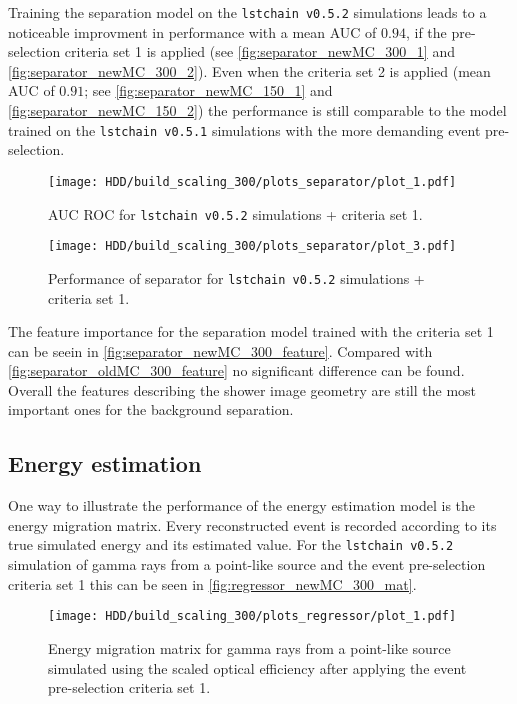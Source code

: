 Training the separation model on the \texttt{lstchain v0.5.2} simulations leads to a noticeable improvment in performance with a mean AUC of $\num{0.94}$, 
if the pre-selection criteria set 1 is applied (see \autoref{fig:separator_newMC_300_1} and \autoref{fig:separator_newMC_300_2}). 
Even when the criteria set 2 is applied (mean AUC of $\num{0.91}$; see \autoref{fig:separator_newMC_150_1} and \autoref{fig:separator_newMC_150_2}) 
the performance is still comparable to the model trained on the \texttt{lstchain v0.5.1} simulations with the more demanding event pre-selection.
\begin{figure}
    \centering
    \texttt{[image: HDD/build\_scaling\_300/plots\_separator/plot\_1.pdf]}
    \caption{AUC ROC for \texttt{lstchain v0.5.2} simulations + criteria set 1.}
    \label{fig:separator_newMC_300_1}
\end{figure}
\begin{figure}
    \centering
    \texttt{[image: HDD/build\_scaling\_300/plots\_separator/plot\_3.pdf]}
    \caption{Performance of separator for \texttt{lstchain v0.5.2} simulations + criteria set 1.}
    \label{fig:separator_newMC_300_2}
\end{figure}

The feature importance for the separation model trained with the criteria set 1 can be seein in \autoref{fig:separator_newMC_300_feature}.
Compared with \autoref{fig:separator_oldMC_300_feature} no significant difference can be found.
Overall the features describing the shower image geometry are still the most important ones for the background separation.


\subsection{Energy estimation}
One way to illustrate the performance of the energy estimation model is the energy migration matrix.
Every reconstructed event is recorded according to its true simulated energy and its estimated value.
For the \texttt{lstchain v0.5.2} simulation of gamma rays from a point-like source and the event pre-selection criteria set 1 this can be seen in 
\autoref{fig:regressor_newMC_300_mat}.
\begin{figure}
    \centering
    \texttt{[image: HDD/build\_scaling\_300/plots\_regressor/plot\_1.pdf]}
    \caption{Energy migration matrix for gamma rays from a point-like source simulated using the scaled optical efficiency after applying the 
        event pre-selection criteria set 1.
    }
    \label{fig:regressor_newMC_300_mat}
\end{figure}

